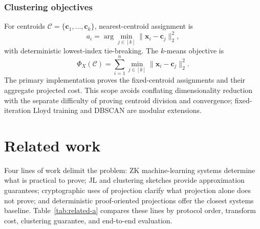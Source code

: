 \documentclass[pdflatex,sn-mathphys-num,iicol]{sn-jnl}
\newcommand{\tpexplain}[1]{}
\theoremstyle{plain}
\theoremstyle{definition}
\theoremstyle{remark}
\begin{document}
\subsubsection{Clustering objectives}
\tpexplain{Paragraph 1 --- define the primary algorithm. Prefer nearest-centroid or assignment/cost verification for the first prototype; full Lloyd iteration is an explicit scope decision.}
For centroids $\mathcal{C}=\{\mathbf{c}_1,\ldots,\mathbf{c}_k\}$, nearest-centroid assignment is
\begin{equation}
a_i=\arg\min_{j\in[k]}\|\mathbf{x}_i-\mathbf{c}_j\|_2^2,
\end{equation}
with deterministic lowest-index tie-breaking. The $k$-means objective is
\begin{equation}
\Phi_X(\mathcal{C})=\sum_{i=1}^{n}\min_{j\in[k]}\|\mathbf{x}_i-\mathbf{c}_j\|_2^2.
\end{equation}
The primary implementation proves the fixed-centroid assignments and their aggregate projected cost. This scope avoids conflating dimensionality reduction with the separate difficulty of proving centroid division and convergence; fixed-iteration Lloyd training and DBSCAN are modular extensions.

\section{Related work}\label{sec:related}

\tpexplain{Opening paragraph --- explain the organizing dimensions. Table~\ref{tab:related-a} should make the novelty gap inspectable rather than relying on adjectives.}
Four lines of work delimit the problem: ZK machine-learning systems determine what is practical to prove; JL and clustering sketches provide approximation guarantees; cryptographic uses of projection clarify what projection alone does not prove; and deterministic proof-oriented projections offer the closest systems baseline. Table~\ref{tab:related-a} compares these lines by protocol order, transform cost, clustering guarantee, and end-to-end evaluation.
\end{document}
